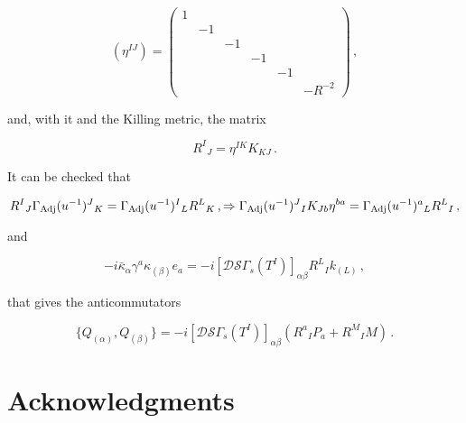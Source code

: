 \documentclass[12pt,a4paper]{article}
\begin{document}
\begin{equation}
(\eta^{IJ})
= 
\left( 
\begin {array}{cccccc} 
1& & & & & \\
 &-1& & & & \\
 & &-1& & & \\
 & & &-1& & \\
 & & & &-1& \\
 & & & & &-{R}^{-2}
\end {array} \right)\, ,
 \end{equation}

\noindent
and, with it and the Killing metric, the matrix 

\begin{equation}
R^{I}{}_{J}=\eta^{IK}K_{KJ}\, .  
\end{equation}
 
\noindent 
It can be checked that 

\begin{equation}
R^{I}{}_{J}\Gamma_{\rm Adj}(u^{-1})^{J}{}_{K}= 
\Gamma_{\rm Adj}(u^{-1})^{I}{}_{L} R^{L}{}_{K}\, ,
\Rightarrow
\Gamma_{\rm Adj}(u^{-1})^{J}{}_{I}K_{Jb}\eta^{ba}= 
\Gamma_{\rm Adj}(u^{-1})^{a}{}_{L}R^{L}{}_{I}\, ,
\end{equation}

\noindent 
and

\begin{equation}
-i\bar{\kappa}_{\alpha}\gamma^{a}\kappa_{(\beta)}e_{a}
=-i\left[\mathcal{D}\mathcal{S}\Gamma_{s}(T^{I})\right]_{\alpha\beta} 
R^{L}{}_{I} k_{(L)}\, ,
\end{equation}

\noindent
that gives the anticommutators

\begin{equation}
\{Q_{(\alpha)},Q_{(\beta)}\}=
-i\left[\mathcal{D}\mathcal{S}\Gamma_{s}(T^{I})\right]_{\alpha\beta} 
(R^{a}{}_{I} P_{a} + R^{M}{}_{I}M)\, .
\end{equation}



\section*{Acknowledgments}
\end{document}
